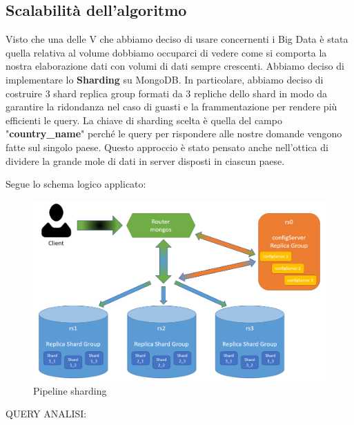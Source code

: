 \documentclass[10pt, a4paper,openany]{article}
\begin{document}
\subsection*{Scalabilità dell'algoritmo}

Visto che una delle V che abbiamo deciso di usare concernenti i Big Data è stata quella relativa al volume dobbiamo occuparci di vedere come si comporta la nostra elaborazione dati con volumi di dati sempre crescenti. Abbiamo deciso di implementare lo \textbf{Sharding} su MongoDB. In particolare, abbiamo deciso di costruire 3 shard replica group formati da 3 repliche dello shard in modo da garantire la ridondanza nel caso di guasti e la frammentazione per rendere più efficienti le query. La chiave di sharding scelta è quella del campo "\textbf{country\_name}" perché le query per rispondere alle nostre domande vengono fatte sul singolo paese. Questo approccio è stato pensato anche nell'ottica di dividere la grande mole di dati in server disposti in ciascun paese. 

Segue lo schema logico applicato:
\begin{figure}[H]
	\centering
	\includegraphics[width=0.8\linewidth]{pics/sharding.png}
	\caption{Pipeline sharding}
\end{figure}

QUERY ANALISI:



\end{document}
